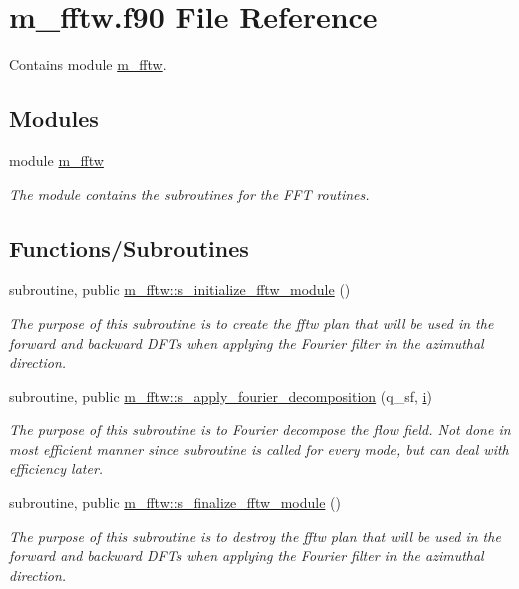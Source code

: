 \hypertarget{m__fftw_8f90}{}\section{m\+\_\+fftw.\+f90 File Reference}
\label{m__fftw_8f90}


Contains module \hyperlink{namespacem__fftw}{m\+\_\+fftw}.  


\subsection*{Modules}
\begin{DoxyCompactItemize}
\item 
module \hyperlink{namespacem__fftw}{m\+\_\+fftw}
\begin{DoxyCompactList}\small\item\em The module contains the subroutines for the F\+FT routines. \end{DoxyCompactList}\end{DoxyCompactItemize}
\subsection*{Functions/\+Subroutines}
\begin{DoxyCompactItemize}
\item 
subroutine, public \hyperlink{namespacem__fftw_a6f924722e9573d6526d5d1ba173f4ac6}{m\+\_\+fftw\+::s\+\_\+initialize\+\_\+fftw\+\_\+module} ()
\begin{DoxyCompactList}\small\item\em The purpose of this subroutine is to create the fftw plan that will be used in the forward and backward D\+F\+Ts when applying the Fourier filter in the azimuthal direction. \end{DoxyCompactList}\item 
subroutine, public \hyperlink{namespacem__fftw_a23c9c885c472ef518a89306f78dab97c}{m\+\_\+fftw\+::s\+\_\+apply\+\_\+fourier\+\_\+decomposition} (q\+\_\+sf, \hyperlink{m__data__output_8f90_aaea4baed8fd8b780f6938f0dc1fb0f72}{i})
\begin{DoxyCompactList}\small\item\em The purpose of this subroutine is to Fourier decompose the flow field. Not done in most efficient manner since subroutine is called for every mode, but can deal with efficiency later. \end{DoxyCompactList}\item 
subroutine, public \hyperlink{namespacem__fftw_a0666fa4d38fb46540fd108b76e835b45}{m\+\_\+fftw\+::s\+\_\+finalize\+\_\+fftw\+\_\+module} ()
\begin{DoxyCompactList}\small\item\em The purpose of this subroutine is to destroy the fftw plan that will be used in the forward and backward D\+F\+Ts when applying the Fourier filter in the azimuthal direction. \end{DoxyCompactList}\end{DoxyCompactItemize}
